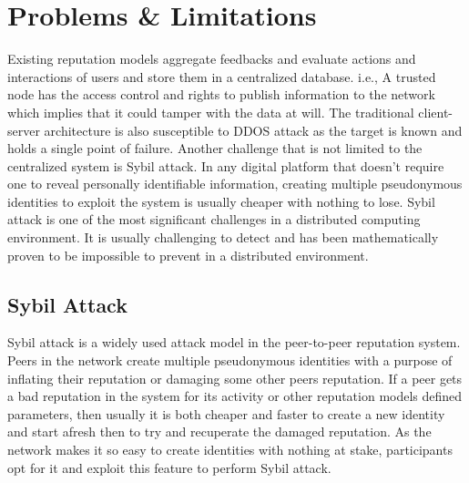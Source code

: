 \section{Problems \& Limitations}
Existing reputation models aggregate feedbacks and evaluate actions and
interactions of users and store them in a centralized database. i.e., A trusted
node has the access control and rights to publish information to the network
which implies that it could tamper with the data at will. The traditional
client-server architecture is also susceptible to DDOS attack as the target is
known and holds a single point of failure. Another challenge that is not
limited to the centralized system is Sybil attack. In any digital platform that
doesn't require one to reveal personally identifiable information, creating
multiple pseudonymous identities to exploit the system is usually cheaper with
nothing to lose. Sybil attack is one of the most significant challenges in a
distributed computing environment. It is usually challenging to detect and has
been mathematically proven to be impossible to prevent in a distributed environment.

\subsection{Sybil Attack}
Sybil attack is a widely used attack model in the peer-to-peer 
reputation system. Peers in the network create multiple 
pseudonymous identities with a purpose of inflating their 
reputation or damaging some other peers reputation. If a peer gets
a bad reputation in the system for its activity or other reputation
models defined parameters, then usually it is both cheaper and  
faster to create a new identity and start afresh then to try and 
recuperate the damaged reputation. As the network makes it so easy
to create identities with nothing at stake, participants opt for it 
and exploit this feature to perform Sybil attack. 

